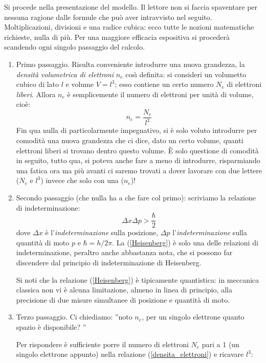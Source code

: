 \smallskip
Si procede nella presentazione del modello.
Il lettore non si faccia spaventare per nessuna ragione dalle formule che può aver intravvisto nel seguito. Moltiplicazioni, divisioni e una radice cubica: ecco tutte le nozioni matematiche richieste, nulla di più.
Per una maggiore efficacia espositiva si proceder\`{a} scandendo ogni singolo passaggio del calcolo.
\begin{enumerate}
\item
Primo passaggio. Risulta conveniente introdurre una nuova grandezza, la \emph{densit\`{a} volumetrica di elettroni} $n_{e}$ cos\`{\i}{} definita: si consideri un volumetto cubico di lato $l$ e volume $V=l^{3}$; esso contiene un certo numero $N_{e}$ di elettroni \emph{liberi}. Allora $n_{e}$ è semplicemente il numero di elettroni per unit\`{a} di volume, cioè:
\begin{equation}\label{densita_elettroni}
n_{e}=\frac{N_{e}}{l^{3}}
\end{equation}
Fin qua nulla di particolarmente impegnativo, si è solo voluto introdurre per comodit\`{a} una nuova grandezza che ci dice, dato un certo volume, quanti elettroni liberi si trovano dentro questo volume. \`E solo questione di comodit\`{a} in seguito, tutto qua, si poteva anche fare a meno di introdurre, risparmiando una fatica ora ma più avanti ci saremo trovati a dover lavorare con due lettere ($N_{e}$ e $l^{3}$) invece che solo con una ($n_{e}$)!
\item
Secondo passaggio (che nulla ha a che fare col primo): scriviamo la relazione di indeterminazione:
\begin{equation}\label{Heisenberg}
\Delta x \Delta p > \frac{\hbar}{2}
\end{equation}
dove $\Delta x$ è l'\emph{indeterminazione} sulla posizione, $\Delta p$ l'\emph{indeterminazione} sulla quantit\`{a} di moto $p$ e $\hbar=h/2\pi$. La (\ref{Heisenberg}) è solo una delle relazioni di indeterminazione, peraltro anche abbastanza nota, che si possono far discendere dal principio di indeterminazione di Heisenberg. 
\par
Si noti che la relazione (\ref{Heisenberg}) è tipicamente quantistica: in meccanica   classica non vi è alcuna limitazione, almeno in linea di principio, alla precisione di due misure simultanee di posizione e quantit\`{a} di moto. 
\item
Terzo passaggio. Ci chiediamo: ''noto $n_{e}$, per un singolo elettrone quanto spazio è disponibile? ''
\par
Per rispondere è sufficiente porre il numero di elettroni $N_{e}$ pari a 1 (un singolo elettrone appunto) nella relazione (\ref{densita_elettroni}) e ricavare $l^{3}$:

\end{enumerate}

